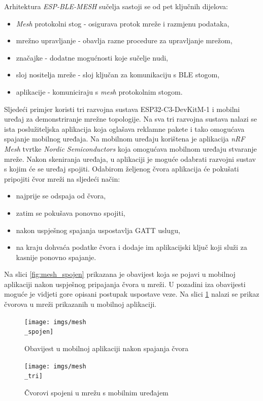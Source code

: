 Arhitektura \textit{ESP-BLE-MESH} sučelja sastoji se od pet ključnih dijelova:
\begin{itemize}
	\item \textit{Mesh} protokolni stog - osigurava protok mreže i razmjenu podataka,
	\item mrežno upravljanje - obavlja razne procedure za upravljanje mrežom, 
	\item značajke - dodatne mogućnosti koje sučelje nudi,
	\item sloj nositelja mreže - sloj ključan za komunikaciju s BLE stogom,
	\item aplikacije - komuniciraju s \textit{mesh} protokolnim stogom.
\end{itemize}

Sljedeći primjer koristi tri razvojna sustava ESP32-C3-DevKitM-1 i mobilni uređaj za demonstriranje mrežne topologije. Na sva tri razvojna sustava nalazi se ista poslužiteljska aplikacija koja oglašava reklamne pakete i tako omogućava spajanje mobilnog uređaja. Na mobilnom uređaju korištena je aplikacija \textit{nRF Mesh} tvrtke \textit{Nordic Semiconductors} koja omogućava mobilnom uređaju stvaranje mreže. Nakon skeniranja uređaja, u aplikaciji je moguće odabrati razvojni sustav s kojim će se uređaj spojiti. Odabirom željenog čvora aplikacija će pokušati pripojiti čvor mreži na sljedeći način:

\begin{itemize}
	\item najprije se odspaja od čvora,
	\item zatim se pokušava ponovno spojiti,
	\item nakon uspješnog spajanja uspostavlja GATT uslugu,
	\item na kraju dohvaća podatke čvora i dodaje im aplikacijski ključ koji služi za kasnije ponovno spajanje.
\end{itemize}

Na slici \ref{fig:mesh_spojen} prikazana je obavijest koja se pojavi u mobilnoj aplikaciji nakon uspješnog pripajanja čvora u mreži. U pozadini iza obavijesti moguće je vidjeti gore opisani postupak uspostave veze. Na slici \ref{fig:mesh_tri} nalazi se prikaz čvorova u mreži prikazanih u mobilnoj aplikaciji. 

\begin{figure}[ht]
	\begin{minipage}[t]{0.4\textwidth}
		\texttt{[image: imgs/mesh\\\_spojen]}
		\caption{Obavijest u mobilnoj aplikaciji nakon spajanja čvora}
		\label{fig:mesh_spojen}
	\end{minipage}
	\hspace*{\fill}
	\begin{minipage}[t]{0.4\textwidth}
		\texttt{[image: imgs/mesh\\\_tri]}
		\caption{Čvorovi spojeni u mrežu s mobilnim uređajem}
		\label{fig:mesh_tri}
	\end{minipage}
\end{figure}



